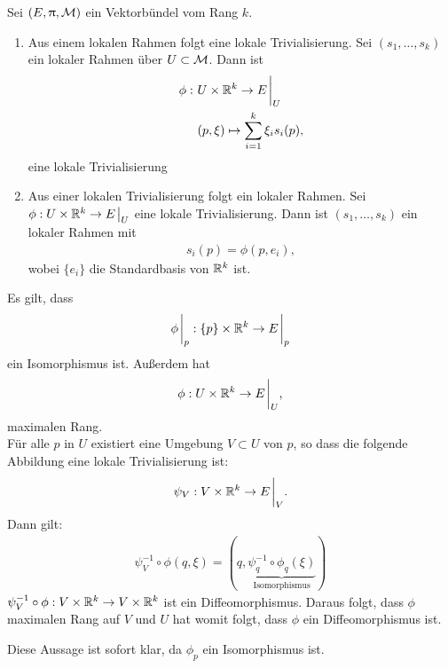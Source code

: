 \begin{satz}
\label{satz:lokalrahmentrivialisierung}
Sei $(E, \uppi, \mathcal{M})$ ein Vektorbündel vom Rang $k$.
\begin{enumerate}
\item Aus einem lokalen Rahmen folgt eine lokale Trivialisierung.
Sei $(s_1, \dots, s_k)$ ein lokaler Rahmen über $U\subset\mathcal{M}$.
Dann ist 
\begin{align*}
\phi : \ & U \times \R^k \to E \eval_U\\
& (p, \xi) \mapsto \sum^k_{i=1} \xi_i s_i (p),
\end{align*}
eine lokale Trivialisierung
\item  Aus einer lokalen Trivialisierung folgt ein lokaler Rahmen.
Sei $\phi: U \times \R^k \to E \eval_U$ eine lokale Trivialisierung.
Dann ist $(s_1, \dots, s_k)$ ein lokaler Rahmen mit 
\begin{align*}
s_i(p) = \phi (p, e_i),
\end{align*} 
wobei $\{ e_i \}$ die Standardbasis von $\mathbb{R}^k$ ist.
\end{enumerate}
\end{satz}
\begin{bew}
Es gilt, dass 
\begin{align*}
\phi \eval_p : \{ p \} \times \R^k \to E \eval_p
\end{align*}
ein Isomorphismus ist.
Außerdem hat
\begin{align*}
\phi : U \times \R^k \to E \eval_U,
\end{align*}
maximalen Rang.\\
Für alle $p$ in $U$ existiert eine Umgebung $V \subset U$ von $p$, so dass die folgende Abbildung eine lokale Trivialisierung ist:
\begin{align*}
\psi_V : V\times \R^k \to E \eval_V.
\end{align*}
Dann gilt:
\begin{align}
\psi^{-1}_V \circ  \phi (q, \xi) = (q, \underbrace{\psi^{-1}_q \circ \phi_q(\xi)}_{\mathrm{Isomorphismus}})
\end{align}
$\psi^{-1}_V \circ \phi : V \times \mathbb{R}^k \to V \times \mathbb{R}^k$ ist ein Diffeomorphismus.
Daraus folgt, dass $\phi$ maximalen Rang auf $V$ und $U$ hat womit folgt, dass $\phi$ ein Diffeomorphismus ist.
\end{bew}
\begin{bew}
Diese Aussage ist sofort klar, da $\phi_p$ ein Isomorphismus ist.
\end{bew}

